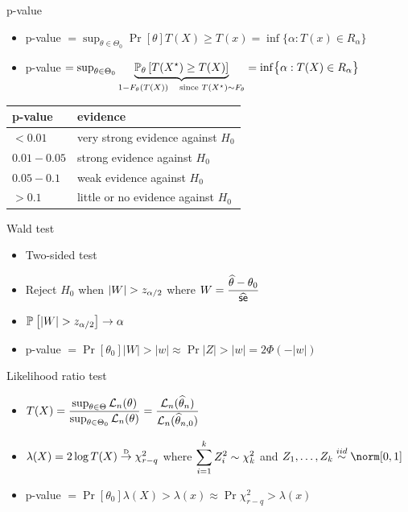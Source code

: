 \documentclass[landscape]{article}
\begin{document}
\begin{multicols*}{2}
\raggedright
p-value
\begin{itemize}
  \item p-value $= \sup_{\theta\in\Theta_0} \Pr[\theta]{T(X) \ge T(x)}
                      = \inf\bigl\{ \alpha: T(x) \in R_\alpha \bigr\}$
  \item p-value $= \sup_{\theta\in\Theta_0}
    \underbrace{\Pr[\theta]{T(X^\star) \ge T(X)}}_{1-F_\theta(T(X))
          \quad \text{since } T(X^\star) \dist F_\theta}
                      = \inf\bigl\{ \alpha: T(X) \in R_\alpha \bigr\}$
\end{itemize}

\centering
\begin{tabular}{ll}
  \textsf{p-value} & \textsf{evidence} \\
  \hline
  $< 0.01$      & very strong evidence against $H_0$ \\
  $0.01 - 0.05$ & strong evidence against $H_0$ \\
  $0.05 - 0.1$  & weak evidence against $H_0$ \\
  $> 0.1$       & little or no evidence against $H_0$ \\
\end{tabular}

\raggedright
Wald test
\begin{itemize}
  \item Two-sided test
  \item Reject $H_0$ when $|W| > \zat$ where
    $W = \displaystyle\frac{\that - \theta_0}{\sehat}$
  \item $\Pr{|W| > \zat} \conv \alpha$
  \item p-value $= \Pr[\theta_0]{|W| > |w|}
                 \approx \Pr{|Z| > |w|}
                 = 2\Phi(-|w|)$
\end{itemize}

Likelihood ratio test
\begin{itemize}
 \item $T(X) = \displaystyle\frac{\sup_{\theta\in\Theta}\Lln(\theta)}%
                                 {\sup_{\theta\in\Theta_0}\Lln(\theta)}
             = \frac{\Lln(\that_n)}{\Lln(\that_{n,0})}$
 \item $\lambda(X) = 2\log T(X) \dconv \chi_{r-q}^2$
   where $\displaystyle\sum_{i=1}^k Z_i^2 \dist \chi_k^2$ and
    $Z_1,\dots,Z_k \distiid \norm[0,1]$
  \item p-value $= \Pr[\theta_0]{\lambda(X) > \lambda(x)}
                 \approx \Pr{\chi_{r-q}^2 > \lambda(x)}$
\end{itemize}


\end{multicols*}
\end{document}
